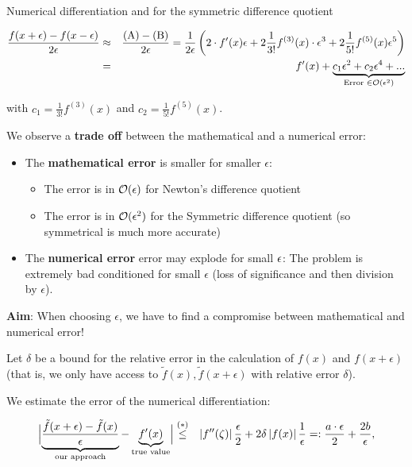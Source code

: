 \documentclass[11pt,compress,t,notes=noshow, xcolor=table]{beamer}
\begin{document}
\begin{vbframe}{Numerical differentiation}
  and for the symmetric difference quotient
  
  \begin{footnotesize}
  \begin{eqnarray*}
  \frac{f(x + \epsilon) - f(x - \epsilon)}{2 \epsilon} &\approx& \frac{\text{(A)} - \text{(B)} }{2 \epsilon} = \frac{1}{2 \epsilon} \left(2\cdot f\!\,'(x) \epsilon + 2 \frac{1}{3 !}f^{(3)}(x)\cdot\epsilon^3 + 2  \frac{1}{5 !}f^{(5)}(x)\epsilon^5  \right) \\ &=&
  f\!\,'(x) +
  \underbrace{c_1\epsilon^2 + c_2 \epsilon^4 + ... }_{\text{Error } \in \mathcal{O}(\epsilon^2)} \\
  \end{eqnarray*}
  \end{footnotesize}
  
  with $c_1 = \frac{1}{3 !}f^{(3)}(x)$ and $c_2 = \frac{1}{5 !}f^{(5)}(x)$.
  
  \framebreak
  
  We observe a \textbf{trade off} between the mathematical and a numerical error:
  \begin{itemize}
  \item The \textbf{mathematical error} is smaller for smaller $\epsilon$:
  \begin{itemize}
  \item The error is in $\mathcal{O}(\epsilon)$ for Newton's difference quotient
  \item The error is in $\mathcal{O}(\epsilon^2)$ for the Symmetric difference quotient (so symmetrical is much more accurate)
  \end{itemize}
  \item The \textbf{numerical error} error may explode for small $\epsilon$: The problem is extremely bad conditioned for small $\epsilon$ (loss of significance and then division by $\epsilon$).
  \end{itemize}
  
  \lz
  
  \textbf{Aim}: When choosing $\epsilon$, we have to find a compromise between mathematical and numerical error!
  
  \framebreak
  
  Let $\delta$ be a bound for the relative error in the calculation of
  $f(x)$ and $f(x+\epsilon)$ (that is, we only have access to $\tilde f(x), \tilde f(x + \epsilon)$ with relative error $\delta$).
  
  \lz
  
  We estimate the error of the numerical differentiation:
  \begin{footnotesize}
  \begin{eqnarray*}
  \Bigl|\underbrace{\frac{\tilde f(x+\epsilon) - \tilde f(x)}{\epsilon}}_{\text{our approach}} - \underbrace{f\!\,'(x)}_{\text{true value}} \Bigr| &\overset{(*)}{\le}& \left| f\!\,''(\zeta)\right|\frac{\epsilon}{2} + 2 \delta\left| f(x) \right|\frac 1\epsilon
  =: \frac{a\cdot\epsilon}2 + \frac{2b}\epsilon, \\
  \end{eqnarray*}
  \end{footnotesize}
  

\end{vbframe}
\end{document}
